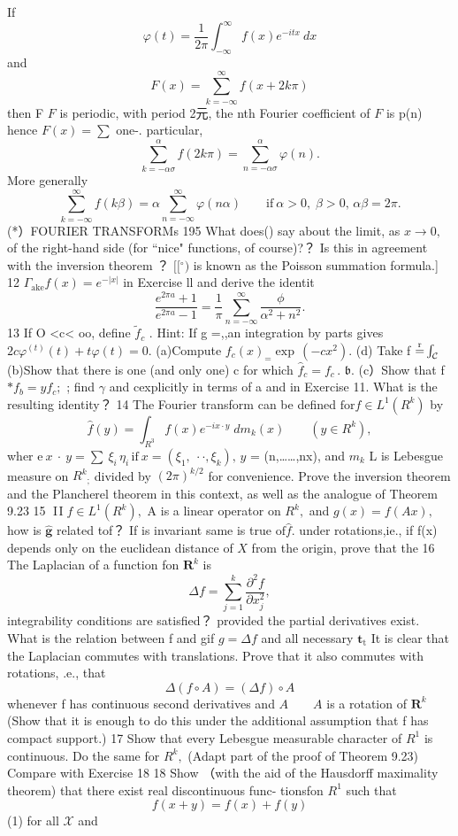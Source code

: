 If $$ \varphi(t)={\frac{1}{2\pi}}\int_{-\infty}^{\infty}f(x)e^{-i t x}~d x $$ and $$ F(x)=\sum_{k=-\infty}^{\infty}f(x+2k\pi) $$ then F ${\mathbf{}}F$ is periodic, with period 2元, the nth Fourier coefficient of ${\mathbf{}}F$ is p(n) hence $F(x)=\sum$ one-. particular, $$ \sum_{k=-\alpha\sigma}^{\alpha}f(2k\pi)=\sum_{n=-\alpha\sigma}^{\alpha}\varphi(n). $$ More generally $$ \sum_{k=-\infty}^{\infty}f(k\beta)=\alpha\sum_{n=-\infty}^{\infty}\varphi(n\alpha)\qquad{\mathrm{if~}}\alpha>0,\;\beta>0,\,\alpha\beta=2\pi. $$ (*）FOURIER TRANSFORMs 195 What does() say about the limit, as $x\to0,$ of the right-hand side (for “nice" functions, of course)?？ Is this in agreement with the inversion theorem ？ $\textstyle[\![{}^{\circ})$ is known as the Poisson summation formula.] 12 $\Gamma_{\mathrm{ake}}f(x)=e^{-\left|x\right|}$ in Exercise ll and derive the identit $$ \frac{e^{2\pi a}+1}{e^{2\pi a}-1}=\frac{1}{\pi}\sum_{n=-\infty}^{\infty}\frac{\phi}{\alpha^{2}+n^{2}}. $$ 13 If O <c< oo, define ${\tilde{f}}_{c}$ . Hint: If g =,,an integration by parts gives $2c\varphi^{(t)}(t)+t\varphi(t)=0.$ (a)Compute $f_{c}(x)_{=}\exp\,(-c x^{2}).$ (d) Take f $\mathrm{\stackrel{r}{=}}\int_{\cal C}$ (b)Show that there is one (and only one) c for which ${\hat{f}}_{c}=f_{c}\,.$ ${\mathfrak{b}}.$ (c）Show that f $*f_{b}=y f_{c};$ ; find $\gamma$ and cexplicitly in terms of a and in Exercise 11. What is the resulting identity？ 14 The Fourier transform can be defined $\mathrm{for}f\in L^{1}(R^{k})$ by $$ \hat{f}(y)=\int_{R^{3}}^{}f(x)e^{-i x\cdot y}\;d m_{k}(x)\qquad(y\in R^{k}), $$ wher ${\mathrm{e}}\ x\ \cdot\ y=\sum\ \xi_{i}\,\eta_{i}\,\mathrm{if}\ x=(\xi_{1},\ \cdot\cdot,\xi_{k}),\,y$ = (n,……,nx), and $m_{k}$ L is Lebesgue measure on $R^{k}{}_{;}$ divided by $(2\pi)^{k/2}$ for convenience. Prove the inversion theorem and the Plancherel theorem in this context, as well as the analogue of Theorem 9.23 15 $\operatorname{I\!I}f\in L^{1}(R^{k}),$ A is a linear operator on $R^{k},$ and $g(x)=f(A x),$ how is $\hat{\boldsymbol{g}}$ related tof？ If is invariant same is true $\mathrm{of}{\hat{f}}.$ under rotations,ie., if f(x) depends only on the euclidean distance of $\textstyle X$ from the origin, prove that the 16 The Laplacian of a function fon ${\boldsymbol{R}}^{k}$ is $$ \Delta f=\sum_{j=1}^{k}{\frac{\partial^{2}f}{\partial x_{j}^{2}}}, $$ integrability conditions are satisfied？ provided the partial derivatives exist. What is the relation between f and gif $g=\Delta f$ and all necessary $\mathbf{t}_{\mathrm{t}}$ It is clear that the Laplacian commutes with translations. Prove that it also commutes with rotations, .e., that $$ \Delta(f\circ A)=(\Delta f)\circ A $$ whenever f has continuous second derivatives and $\scriptstyle A\quad\quad A$ is a rotation of ${\boldsymbol{R}}^{k}$ (Show that it is enough to do this under the additional assumption that f has compact support.) 17 Show that every Lebesgue measurable character of $R^{1}$ is continuous. Do the same for $R^{k},$ (Adapt part of the proof of Theorem 9.23) Compare with Exercise 18 18 Show （with the aid of the Hausdorff maximality theorem) that there exist real discontinuous func- tionsfon $R^{1}$ such that $$ f(x+y)=f(x)+f(y) $$ (1) for all $\textstyle{\mathcal{X}}$ and 